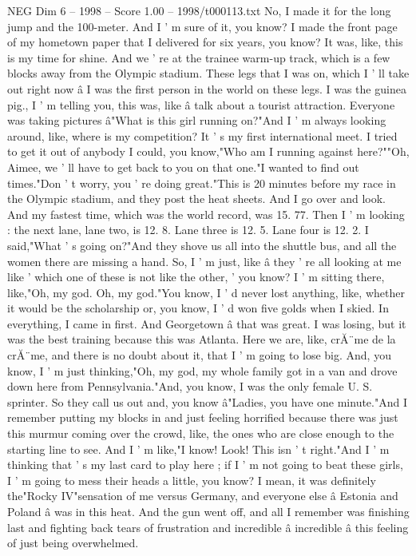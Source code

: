 \begin{textsample}{NEG Dim 6 – 1998 – Score 1.00 – 1998/t000113.txt}
No, I made it for the long jump and the 100-meter.
And I ' m sure of it, you know?
I made the front page of my hometown paper that I delivered for six years, you know?
It was, like, this is my time for shine.
And we ' re at the trainee warm-up track, which is a few blocks away from the Olympic stadium.
These legs that I was on, which I ' ll take out right now â I was the first person in the world on these legs.
I was the guinea pig., I ' m telling you, this was, like â talk about a tourist attraction.
Everyone was taking pictures â"What is this girl running on?"And I ' m always looking around, like, where is my competition?
It ' s my first international meet.
I tried to get it out of anybody I could, you know,"Who am I running against here?""Oh, Aimee, we ' ll have to get back to you on that one."I wanted to find out times."Don ' t worry, you ' re doing great."This is 20 minutes before my race in the Olympic stadium, and they post the heat sheets.
And I go over and look.
And my fastest time, which was the world record, was 15. 77.
Then I ' m looking : the next lane, lane two, is 12. 8.
Lane three is 12. 5.
Lane four is 12. 2.
I said,"What ' s going on?"And they shove us all into the shuttle bus, and all the women there are missing a hand.
So, I ' m just, like â they ' re all looking at me like ' which one of these is not like the other, ' you know?
I ' m sitting there, like,"Oh, my god.
Oh, my god."You know, I ' d never lost anything, like, whether it would be the scholarship or, you know, I ' d won five golds when I skied.
In everything, I came in first.
And Georgetown â that was great.
I was losing, but it was the best training because this was Atlanta.
Here we are, like, crĂ¨me de la crĂ¨me, and there is no doubt about it, that I ' m going to lose big.
And, you know, I ' m just thinking,"Oh, my god, my whole family got in a van and drove down here from Pennsylvania."And, you know, I was the only female U.
S. sprinter.
So they call us out and, you know â"Ladies, you have one minute."And I remember putting my blocks in and just feeling horrified because there was just this murmur coming over the crowd, like, the ones who are close enough to the starting line to see.
And I ' m like,"I know!
Look!
This isn ' t right."And I ' m thinking that ' s my last card to play here ; if I ' m not going to beat these girls, I ' m going to mess their heads a little, you know?
I mean, it was definitely the"Rocky IV"sensation of me versus Germany, and everyone else â Estonia and Poland â was in this heat.
And the gun went off, and all I remember was finishing last and fighting back tears of frustration and incredible â incredible â this feeling of just being overwhelmed.

\end{textsample}
